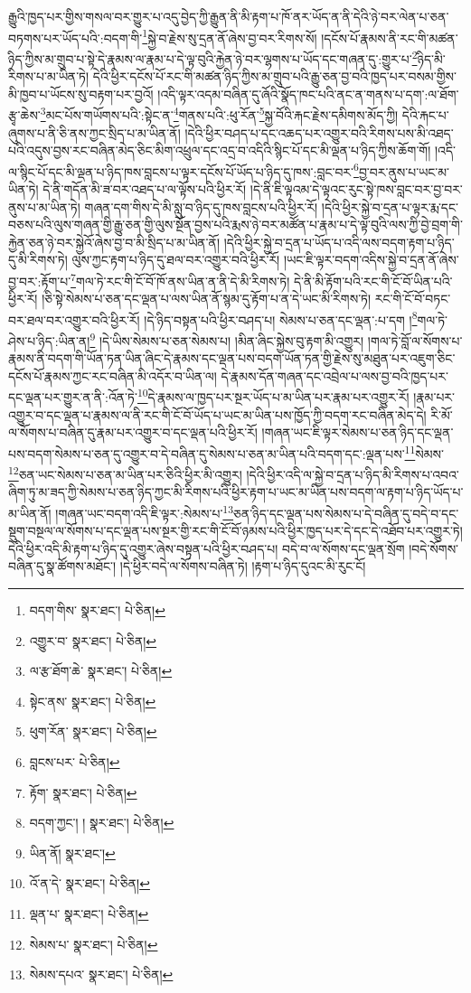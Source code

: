 རྒྱུའི་ཁྱད་པར་གྱིས་གསལ་བར་གྱུར་པ་འདུ་བྱེད་ཀྱི་རྒྱུན་ནི་མི་རྟག་པ་ཁོ་ནར་ཡོད་ན་ནི་དེའི་ཉེ་བར་ལེན་པ་ཅན་བཏགས་པར་ཡོད་པའི་:བདག་གི་\footnote{བདག་གིས་  སྣར་ཐང་།  པེ་ཅིན། }སྐྱེ་བ་རྗེས་སུ་དྲན་ནོ་ཞེས་བྱ་བར་རིགས་སོ། །དངོས་པོ་རྣམས་ནི་རང་གི་མཚན་ཉིད་ཀྱིས་མ་གྲུབ་པ་སྟེ་དེ་རྣམས་ལ་རྣམ་པ་དེ་ལྟ་བུའི་རྐྱེན་ཉེ་བར་ལྷགས་པ་ཡོད་དང་གཞན་དུ་:གྱུར་པ་\footnote{འགྱུར་བ་  སྣར་ཐང་།  པེ་ཅིན། }ཉིད་མི་རིགས་པ་མ་ཡིན་ཏེ། དེའི་ཕྱིར་དངོས་པོ་རང་གི་མཚན་ཉིད་ཀྱིས་མ་གྲུབ་པའི་རྒྱུ་ཅན་བྱ་བའི་ཁྱད་པར་བསམ་གྱིས་མི་ཁྱབ་པ་ཡོངས་སུ་བརྟག་པར་བྱའོ། །འདི་ལྟར་འདམ་བཞིན་དུ་ཞོའི་སྣོད་ཁང་པའི་ནང་ན་གནས་པ་དག་:ལ་ཐོག་རྩྭ་ཆེས་\footnote{ལ་རྩ་ཐོག་ཆེ་  སྣར་ཐང་།  པེ་ཅིན། }མང་པོས་གཡོགས་པའི་:སྟེང་ན་\footnote{སྟེང་ནས་  སྣར་ཐང་།  པེ་ཅིན། }གནས་པའི་:ཕུ་རོན་\footnote{ཕུག་རོན་  སྣར་ཐང་།  པེ་ཅིན། }སྐྱ་བོའི་རྐང་རྗེས་དམིགས་མོད་ཀྱི། དེའི་རྐང་པ་ཞུགས་པ་ནི་ཅི་ནས་ཀྱང་སྲིད་པ་མ་ཡིན་ནོ། །དེའི་ཕྱིར་བཤད་པ་དང་འཆད་པར་འགྱུར་བའི་རིགས་པས་མི་འཐད་པའི་འདུས་བྱས་རང་བཞིན་མེད་ཅིང་མིག་འཕྲུལ་དང་འདྲ་བ་འདིའི་སྙིང་པོ་དང་མི་ལྡན་པ་ཉིད་ཀྱིས་ཆོག་གོ། །འདི་ལ་སྙིང་པོ་དང་མི་ལྡན་པ་ཉིད་ཁས་བླངས་པ་ལྟར་དངོས་པོ་ཡོད་པ་ཉིད་དུ་ཁས་:བླང་བར་\footnote{བླངས་པར་  པེ་ཅིན། }བྱ་བར་ནུས་པ་ཡང་མ་ཡིན་ཏེ། དེ་ནི་གདོན་མི་ཟ་བར་འཐད་པ་ལ་ལྟོས་པའི་ཕྱིར་རོ། །དེ་ནི་ཇི་ལྟའམ་དེ་ལྟའང་རུང་སྟེ་ཁས་བླང་བར་བྱ་བར་ནུས་པ་མ་ཡིན་ཏེ། གཞན་དག་གིས་དེ་མི་སླུ་བ་ཉིད་དུ་ཁས་བླངས་པའི་ཕྱིར་རོ། །དེའི་ཕྱིར་སྐྱེ་བ་དྲན་པ་ལྟར་རྨ་དང་བཅས་པའི་ལུས་གཞན་གྱི་རྒྱུ་ཅན་གྱི་ལུས་སྔོན་བྱས་པའི་རྨས་ཉེ་བར་མཚོན་པ་རྣམ་པ་དེ་ལྟ་བུའི་ལས་ཀྱི་བྱེ་བྲག་གི་རྐྱེན་ཅན་ཉེ་བར་སྐྱེའོ་ཞེས་བྱ་བ་མི་སྲིད་པ་མ་ཡིན་ནོ། །དེའི་ཕྱིར་སྐྱེ་བ་དྲན་པ་ཡོད་པ་འདི་ལས་བདག་རྟག་པ་ཉིད་དུ་མི་རིགས་ཏེ། ལུས་ཀྱང་རྟག་པ་ཉིད་དུ་ཐལ་བར་འགྱུར་བའི་ཕྱིར་རོ། །ཡང་ཇི་ལྟར་བདག་འདིས་སྐྱེ་བ་དྲན་ནོ་ཞེས་བྱ་བར་:རྟོག་པ་\footnote{རྟོག་  སྣར་ཐང་།  པེ་ཅིན། }གལ་ཏེ་རང་གི་ངོ་བོ་ཁོ་ནས་ཡིན་ན་ནི་དེ་མི་རིགས་ཏེ། དེ་ནི་མི་རྟོག་པའི་རང་གི་ངོ་བོ་ཡིན་པའི་ཕྱིར་རོ། །ཅི་སྟེ་སེམས་པ་ཅན་དང་ལྡན་པ་ལས་ཡིན་ནོ་སྙམ་དུ་རྟོག་པ་ན་དེ་ཡང་མི་རིགས་ཏེ། རང་གི་ངོ་བོ་བཏང་བར་ཐལ་བར་འགྱུར་བའི་ཕྱིར་རོ། །དེ་ཉིད་བསྟན་པའི་ཕྱིར་བཤད་པ། སེམས་པ་ཅན་དང་ལྡན་:པ་དག །\footnote{བདག་ཀྱང་། །  སྣར་ཐང་།  པེ་ཅིན། }གལ་ཏེ་ཤེས་པ་ཉིད་:ཡིན་ན།\footnote{ཡིན་ནོ།  སྣར་ཐང་། } །དེ་ཡིས་སེམས་པ་ཅན་སེམས་པ། །མིན་ཞིང་སྐྱེས་བུ་རྟག་མི་འགྱུར། །གལ་ཏེ་བློ་ལ་སོགས་པ་རྣམས་ནི་བདག་གི་ཡོན་ཏན་ཡིན་ཞིང་དེ་རྣམས་དང་ལྡན་པས་བདག་ཡོན་ཏན་གྱི་རྗེས་སུ་མཐུན་པར་འཇུག་ཅིང་དངོས་པོ་རྣམས་ཀྱང་རང་བཞིན་མི་འདོར་བ་ཡིན་ལ། དེ་རྣམས་དོན་གཞན་དང་འབྲེལ་པ་ལས་བྱ་བའི་ཁྱད་པར་དང་ལྡན་པར་གྱུར་ན་ནི་:འོན་ཏེ་\footnote{འོ་ན་དེ་  སྣར་ཐང་།  པེ་ཅིན། }དེ་རྣམས་ལ་ཁྱད་པར་སྔར་ཡོད་པ་མ་ཡིན་པར་རྣམ་པར་འགྱུར་རོ། །རྣམ་པར་འགྱུར་བ་དང་ལྡན་པ་རྣམས་ལ་ནི་རང་གི་ངོ་བོ་ཡོད་པ་ཡང་མ་ཡིན་པས་ཁྱོད་ཀྱི་བདག་རང་བཞིན་མེད་དེ། རི་མོ་ལ་སོགས་པ་བཞིན་དུ་རྣམ་པར་འགྱུར་བ་དང་ལྡན་པའི་ཕྱིར་རོ། །གཞན་ཡང་ཇི་ལྟར་སེམས་པ་ཅན་ཉིད་དང་ལྡན་པས་བདག་སེམས་པ་ཅན་དུ་འགྱུར་བ་དེ་བཞིན་དུ་སེམས་པ་ཅན་མ་ཡིན་པའི་བདག་དང་:ལྡན་པས་\footnote{ལྡན་པ་  སྣར་ཐང་།  པེ་ཅིན། }སེམས་\footnote{སེམས་པ་  སྣར་ཐང་།  པེ་ཅིན། }ཅན་ཡང་སེམས་པ་ཅན་མ་ཡིན་པར་ཅིའི་ཕྱིར་མི་འགྱུར། །དེའི་ཕྱིར་འདི་ལ་སྐྱེ་བ་དྲན་པ་ཉིད་མི་རིགས་པ་འབའ་ཞིག་ཏུ་མ་ཟད་ཀྱི་སེམས་པ་ཅན་ཉིད་ཀྱང་མི་རིགས་པའི་ཕྱིར་རྟག་པ་ཡང་མ་ཡིན་པས་བདག་ལ་རྟག་པ་ཉིད་ཡོད་པ་མ་ཡིན་ནོ། །གཞན་ཡང་བདག་འདི་ཇི་ལྟར་:སེམས་པ་\footnote{སེམས་དཔའ་  སྣར་ཐང་།  པེ་ཅིན། }ཅན་ཉིད་དང་ལྡན་པས་སེམས་པ་དེ་བཞིན་དུ་བདེ་བ་དང་སྡུག་བསྔལ་ལ་སོགས་པ་དང་ལྡན་པས་སྔར་གྱི་རང་གི་ངོ་བོ་ཉམས་པའི་ཕྱིར་ཁྱད་པར་དེ་དང་དེ་འཐོབ་པར་འགྱུར་ཏེ། དེའི་ཕྱིར་འདི་མི་རྟག་པ་ཉིད་དུ་འགྱུར་ཞེས་བསྟན་པའི་ཕྱིར་བཤད་པ། བདེ་བ་ལ་སོགས་དང་ལྡན་སྲོག །བདེ་སོགས་བཞིན་དུ་སྣ་ཚོགས་མཐོང་། །དེ་ཕྱིར་བདེ་ལ་སོགས་བཞིན་ཏེ། །རྟག་པ་ཉིད་དུའང་མི་རུང་ངོ། 